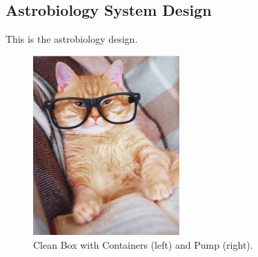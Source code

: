 \newpage
\subsection{Astrobiology System Design}
\label{sec:Astrobiology Design}
This is the astrobiology design.

\begin{figure}[H]
	\begin{center}
		\includegraphics[width=0.5\textwidth]{figures/sample.png}
		\caption{Clean Box with Containers (left) and Pump (right).}
		\label{fig:Astrobio System}
	\end{center}
\end{figure}


